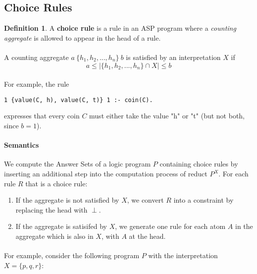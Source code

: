 \documentclass{article}
\theoremstyle{plain}
\theoremstyle{definition}
\newtheorem{defn}[thm]{Definition} %
\begin{document}
\begin{multicols}{2}
\subsection{Choice Rules}

\begin{defn}A \textbf{choice rule} is a rule in an ASP program where a \textit{counting aggregate} is allowed to appear in the head of a rule.\end{defn}

\paragraph{} A counting aggregate $a\ \{ h_1, h_2, ..., h_n \}\ b$ is satisfied by an interpretation $X$ if $$a \leq |\{h_1, h_2, ..., h_n \} \cap X| \leq b$$

\paragraph{} For example, the rule 

\begin{lstlisting}
1 {value(C, h), value(C, t)} 1 :- coin(C).
\end{lstlisting}

expresses that every coin $C$ must either take the value "h" or "t" (but not both, since $b = 1$).

\paragraph{Semantics} We compute the Answer Sets of a logic program $P$ containing choice rules by inserting an additional step into the computation process of reduct $P^X$. For each rule $R$ that is a choice rule:

\begin{enumerate}
\item If the aggregate is not satisfied by $X$, we convert $R$ into a constraint by replacing the head with $\perp$.
\item If the aggregate is satisifed by $X$, we generate one rule for each atom $A$ in the aggregate which is also in $X$, with $A$ at the head.
\end{enumerate}

\paragraph{} For example, consider the following program $P$ with the interpretation $X = \{p, q, r\}$:


\end{multicols}
\end{document}
